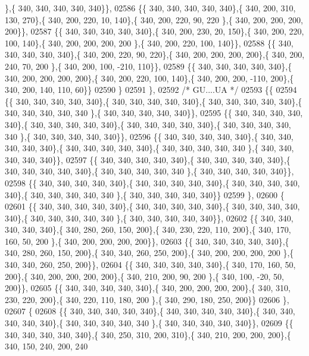 \begin{DoxyCode}
      \},\{ 340, 340, 340, 340, 340\}\},
02586 \{\{ 340, 340, 340, 340, 340\},\{ 340, 200, 310, 130, 270\},\{ 340, 200, 220,  10, 140\},\{ 340, 200, 220,  90, 220
      \},\{ 340, 200, 200, 200, 200\}\},
02587 \{\{ 340, 340, 340, 340, 340\},\{ 340, 200, 230,  20, 150\},\{ 340, 200, 220, 100, 140\},\{ 340, 200, 200, 200, 200
      \},\{ 340, 200, 220, 100, 140\}\},
02588 \{\{ 340, 340, 340, 340, 340\},\{ 340, 200, 220,  90, 220\},\{ 340, 200, 200, 200, 200\},\{ 340, 200, 240,  70, 200
      \},\{ 340, 200, 100, -210, 110\}\},
02589 \{\{ 340, 340, 340, 340, 340\},\{ 340, 200, 200, 200, 200\},\{ 340, 200, 220, 100, 140\},\{ 340, 200, 200, -110, 
      200\},\{ 340, 200, 140, 110,  60\}\}
02590 \}
02591 \},
02592 \textcolor{comment}{/* GU....UA */}
02593 \{\{
02594 \{\{ 340, 340, 340, 340, 340\},\{ 340, 340, 340, 340, 340\},\{ 340, 340, 340, 340, 340\},\{ 340, 340, 340, 340, 340
      \},\{ 340, 340, 340, 340, 340\}\},
02595 \{\{ 340, 340, 340, 340, 340\},\{ 340, 340, 340, 340, 340\},\{ 340, 340, 340, 340, 340\},\{ 340, 340, 340, 340, 340
      \},\{ 340, 340, 340, 340, 340\}\},
02596 \{\{ 340, 340, 340, 340, 340\},\{ 340, 340, 340, 340, 340\},\{ 340, 340, 340, 340, 340\},\{ 340, 340, 340, 340, 340
      \},\{ 340, 340, 340, 340, 340\}\},
02597 \{\{ 340, 340, 340, 340, 340\},\{ 340, 340, 340, 340, 340\},\{ 340, 340, 340, 340, 340\},\{ 340, 340, 340, 340, 340
      \},\{ 340, 340, 340, 340, 340\}\},
02598 \{\{ 340, 340, 340, 340, 340\},\{ 340, 340, 340, 340, 340\},\{ 340, 340, 340, 340, 340\},\{ 340, 340, 340, 340, 340
      \},\{ 340, 340, 340, 340, 340\}\}
02599 \},
02600 \{
02601 \{\{ 340, 340, 340, 340, 340\},\{ 340, 340, 340, 340, 340\},\{ 340, 340, 340, 340, 340\},\{ 340, 340, 340, 340, 340
      \},\{ 340, 340, 340, 340, 340\}\},
02602 \{\{ 340, 340, 340, 340, 340\},\{ 340, 280, 260, 150, 200\},\{ 340, 230, 220, 110, 200\},\{ 340, 170, 160,  50, 200
      \},\{ 340, 200, 200, 200, 200\}\},
02603 \{\{ 340, 340, 340, 340, 340\},\{ 340, 280, 260, 150, 200\},\{ 340, 340, 260, 250, 200\},\{ 340, 200, 200, 200, 200
      \},\{ 340, 340, 260, 250, 200\}\},
02604 \{\{ 340, 340, 340, 340, 340\},\{ 340, 170, 160,  50, 200\},\{ 340, 200, 200, 200, 200\},\{ 340, 210, 200,  90, 200
      \},\{ 340, 100, -20,  50, 200\}\},
02605 \{\{ 340, 340, 340, 340, 340\},\{ 340, 200, 200, 200, 200\},\{ 340, 310, 230, 220, 200\},\{ 340, 220, 110, 180, 200
      \},\{ 340, 290, 180, 250, 200\}\}
02606 \},
02607 \{
02608 \{\{ 340, 340, 340, 340, 340\},\{ 340, 340, 340, 340, 340\},\{ 340, 340, 340, 340, 340\},\{ 340, 340, 340, 340, 340
      \},\{ 340, 340, 340, 340, 340\}\},
02609 \{\{ 340, 340, 340, 340, 340\},\{ 340, 250, 310, 200, 310\},\{ 340, 210, 200, 200, 200\},\{ 340, 150, 240, 200, 240

\end{DoxyCode}
